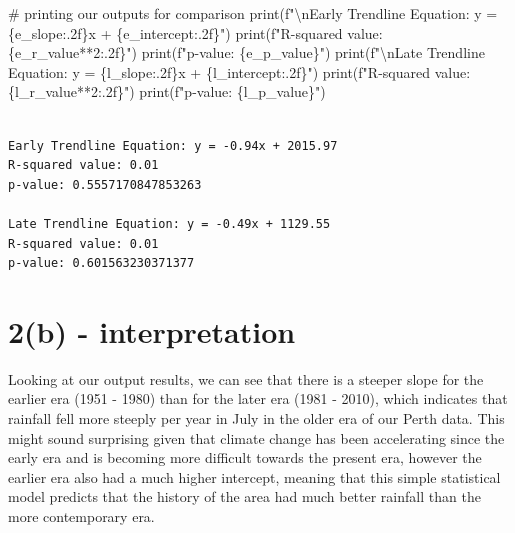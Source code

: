 \documentclass[
  letterpaper,
  DIV=11,
  numbers=noendperiod]{scrartcl}
\newenvironment{Shaded}{\begin{snugshade}}{\end{snugshade}}
\newcommand{\BuiltInTok}[1]{\textcolor[rgb]{0.00,0.23,0.31}{#1}}
\newcommand{\CharTok}[1]{\textcolor[rgb]{0.13,0.47,0.30}{#1}}
\newcommand{\CommentTok}[1]{\textcolor[rgb]{0.37,0.37,0.37}{#1}}
\newcommand{\DecValTok}[1]{\textcolor[rgb]{0.68,0.00,0.00}{#1}}
\newcommand{\NormalTok}[1]{\textcolor[rgb]{0.00,0.23,0.31}{#1}}
\newcommand{\OperatorTok}[1]{\textcolor[rgb]{0.37,0.37,0.37}{#1}}
\newcommand{\SpecialCharTok}[1]{\textcolor[rgb]{0.37,0.37,0.37}{#1}}
\newcommand{\SpecialStringTok}[1]{\textcolor[rgb]{0.13,0.47,0.30}{#1}}
\begin{document}
\begin{Shaded}
\begin{Highlighting}[]
\CommentTok{\# printing our outputs for comparison}
\BuiltInTok{print}\NormalTok{(}\SpecialStringTok{f"}\CharTok{\textbackslash{}n}\SpecialStringTok{Early Trendline Equation: y = }\SpecialCharTok{\{}\NormalTok{e\_slope}\SpecialCharTok{:.2f\}}\SpecialStringTok{x + }\SpecialCharTok{\{}\NormalTok{e\_intercept}\SpecialCharTok{:.2f\}}\SpecialStringTok{"}\NormalTok{)}
\BuiltInTok{print}\NormalTok{(}\SpecialStringTok{f"R{-}squared value: }\SpecialCharTok{\{}\NormalTok{e\_r\_value}\OperatorTok{**}\DecValTok{2}\SpecialCharTok{:.2f\}}\SpecialStringTok{"}\NormalTok{)}
\BuiltInTok{print}\NormalTok{(}\SpecialStringTok{f"p{-}value: }\SpecialCharTok{\{}\NormalTok{e\_p\_value}\SpecialCharTok{\}}\SpecialStringTok{"}\NormalTok{)}
\BuiltInTok{print}\NormalTok{(}\SpecialStringTok{f"}\CharTok{\textbackslash{}n}\SpecialStringTok{Late Trendline Equation: y = }\SpecialCharTok{\{}\NormalTok{l\_slope}\SpecialCharTok{:.2f\}}\SpecialStringTok{x + }\SpecialCharTok{\{}\NormalTok{l\_intercept}\SpecialCharTok{:.2f\}}\SpecialStringTok{"}\NormalTok{)}
\BuiltInTok{print}\NormalTok{(}\SpecialStringTok{f"R{-}squared value: }\SpecialCharTok{\{}\NormalTok{l\_r\_value}\OperatorTok{**}\DecValTok{2}\SpecialCharTok{:.2f\}}\SpecialStringTok{"}\NormalTok{)}
\BuiltInTok{print}\NormalTok{(}\SpecialStringTok{f"p{-}value: }\SpecialCharTok{\{}\NormalTok{l\_p\_value}\SpecialCharTok{\}}\SpecialStringTok{"}\NormalTok{)}
\end{Highlighting}
\end{Shaded}

\begin{verbatim}

Early Trendline Equation: y = -0.94x + 2015.97
R-squared value: 0.01
p-value: 0.5557170847853263

Late Trendline Equation: y = -0.49x + 1129.55
R-squared value: 0.01
p-value: 0.601563230371377
\end{verbatim}

\section{2(b) - interpretation}\label{b---interpretation}

Looking at our output results, we can see that there is a steeper slope
for the earlier era (1951 - 1980) than for the later era (1981 - 2010),
which indicates that rainfall fell more steeply per year in July in the
older era of our Perth data. This might sound surprising given that
climate change has been accelerating since the early era and is becoming
more difficult towards the present era, however the earlier era also had
a much higher intercept, meaning that this simple statistical model
predicts that the history of the area had much better rainfall than the
more contemporary era.
\end{document}
